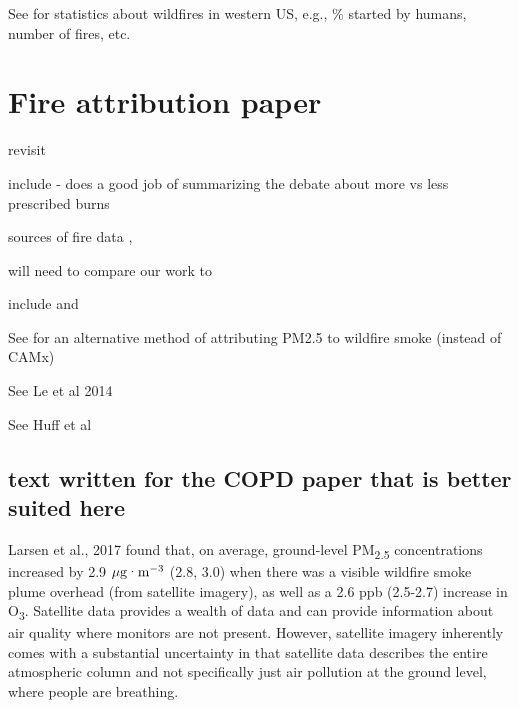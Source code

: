 See \cite{Fusco2016} for statistics about wildfires in western US, e.g., \% started by humans, number of fires, etc.

\section{Fire attribution paper}

revisit \cite{schweizer_using_2017}

include \cite{long_aligning_2018} - does a good job of summarizing the debate about more vs less prescribed burns

sources of fire data \cite{http://www.nifc.gov/fireInfo/fireInfo_main.html}, \cite{https://fam.nwcg.gov/fam-web/}

will need to compare our work to \cite{fann_health_2017}

include \cite{westerling_increasing_2016,WesterlingCorrection2016} and \cite{abatzoglou_impact_2016}

See \cite{Kaulfus2017} for an alternative method of attributing PM2.5 to wildfire smoke (instead of CAMx)

See Le et al 2014 \cite{http://dx.doi.org/10.3390/ijgi3020713}

See Huff et al \cite{http://dx.doi.org/10.4137/EHI.S19590}

\subsection{text written for the COPD paper that is better suited here}
Larsen et al., 2017 \cite{larsen_impacts_2017} found that, on average, ground-level PM\textsubscript{2.5} concentrations increased by 2.9 \begin{math}\mu\text{g\textperiodcentered m}^{-3}\end{math} (2.8, 3.0) when there was a visible wildfire smoke plume overhead (from satellite imagery), as well as a 2.6 ppb (2.5-2.7) increase in O\textsubscript{3}. Satellite data provides a wealth of data and can provide information about air quality where monitors are not present. However, satellite imagery inherently comes with a substantial uncertainty in that satellite data describes the entire atmospheric column and not specifically just air pollution at the ground level, where people are breathing. %
